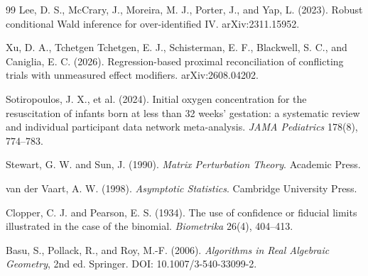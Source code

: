 \documentclass{article}
\begin{document}
\begin{thebibliography}{99}
   Lee, D. S., McCrary, J., Moreira, M. J., Porter, J., and Yap, L. (2023). Robust conditional Wald inference for over-identified IV. arXiv:2311.15952.

   Xu, D. A., Tchetgen Tchetgen, E. J., Schisterman, E. F., Blackwell, S. C., and Caniglia, E. C. (2026). Regression-based proximal reconciliation of conflicting trials with unmeasured effect modifiers. arXiv:2608.04202.

   Sotiropoulos, J. X., et al. (2024). Initial oxygen concentration for the resuscitation of infants born at less than 32 weeks' gestation: a systematic review and individual participant data network meta-analysis. \emph{JAMA Pediatrics} 178(8), 774--783.

   Stewart, G. W. and Sun, J. (1990). \emph{Matrix Perturbation Theory}. Academic Press.

   van der Vaart, A. W. (1998). \emph{Asymptotic Statistics}. Cambridge University Press.

   Clopper, C. J. and Pearson, E. S. (1934). The use of confidence or fiducial limits illustrated in the case of the binomial. \emph{Biometrika} 26(4), 404--413.

   Basu, S., Pollack, R., and Roy, M.-F. (2006). \emph{Algorithms in Real Algebraic Geometry}, 2nd ed. Springer. DOI: 10.1007/3-540-33099-2.

\end{thebibliography}
\end{document}

